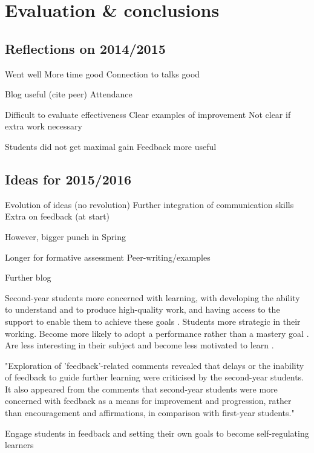 \chapter{Evaluation \& conclusions}\label{ch:conc}

\section{Reflections on 2014/2015}

Went well
More time good
Connection to talks good

Blog useful (cite peer)
Attendance

Difficult to evaluate effectiveness
Clear examples of improvement
Not clear if extra work necessary

Students did not get maximal gain
Feedback more useful

\section{Ideas for 2015/2016}\label{sec:future}

Evolution of ideas (no revolution)
Further integration of communication skills
Extra on feedback (at start)

However, bigger punch in Spring

Longer for formative assessment
Peer-writing/examples

Further blog


Second-year students more concerned with learning, with developing the ability to understand and to produce high-quality work, and having access to the support to enable them to achieve these goals \citep{Zaitseva2013}. Students more strategic in their working. Become more likely to adopt a performance rather than a mastery goal \citep{Lieberman2007}. Are less interesting in their subject and become less motivated to learn \citep{Lieberman2007}.

"Exploration of 'feedback'-related comments revealed that delays or the
inability of feedback to guide further learning were criticised by the
second-year students. It also appeared from the comments that second-year
students were more concerned with feedback as a means for improvement
and progression, rather than encouragement and affirmations, in comparison
with first-year students." \citep{Zaitseva2013}

Engage students in feedback and setting their own goals to become self-regulating learners \citep{Nicol2006}

